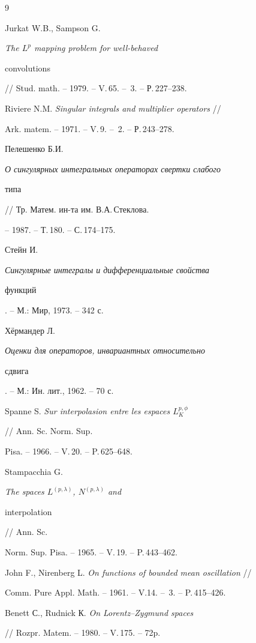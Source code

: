  


 


\begin{thebibliography}{9} 


 




Jurkat W.B., Sampson G. {\em The $L^p$ mapping problem for well-behaved 


convolutions} // Stud. math. -- 1979. -- V.\,65. -- \No\,3. -- Р.\,227--238. 




Riviere N.M. {\em Singular integrals and multiplier operators} // 


Ark. matem. -- 1971. -- V.\,9. -- \No\,2. -- Р.\,243--278. 




Пелешенко Б.И. {\em О сингулярных интегральных операторах свертки слабого 


типа} // Тр. Матем. ин-та им. В.А.\,Стеклова. 


-- 1987. -- Т.\,180. -- С.\,174--175. 




Стейн И. {\em Сингулярные интегралы и дифференциальные свойства 


функций}. -- М.: Мир, 1973. -- 342 с. 




Х\"ермандер Л. {\em Оценки для операторов, инвариантных относительно 


сдвига}. -- М.: Ин. лит., 1962. -- 70 с. 




Spanne S. {\em Sur interpolasion entre les espaces $L^{p,\phi}_K$} 


// Ann. Sc.  Norm. Sup. 


Pisa. -- 1966. -- V.\,20. -- P.\,625--648. 




Stampacchia G. {\em The spaces $L^{(p,\lambda)}$, $N^{(p,\lambda)}$ and 


interpolation} // Ann. Sc. 


Norm. Sup. Pisa. -- 1965. -- V.\,19. -- P.\,443--462. 




John F., Nirenberg L. {\em On functions of bounded mean oscillation} // 


Comm. Pure Appl. Math. -- 1961. -- V.14. -- \No\,3. -- P.\,415--426. 




Benett С., Rudnick К. {\em On Lorentz--Zygmund spaces} 


// Rozpr. Matem. -- 1980. -- V.\,175. -- 72p. 


 


\end{thebibliography} 


